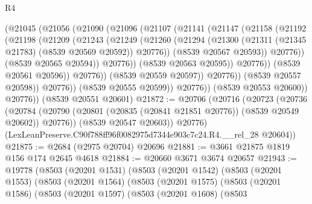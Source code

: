 \begin{lexlean}{R4}
\begin{coremodule}
                        (@21045
                          (@21056
                            (@21090
                              (@21096
                                (@21107
                                  (@21141
                                    (@21147
                                      (@21158
                                        (@21192
                                          (@21198
                                            (@21209
                                              (@21243
                                                (@21249
                                                  (@21260
                                                    (@21294
                                                      (@21300
                                                        (@21311
                                                          (@21345 @21783)
                                                          (@8539 @20569 @20592))
                                                        @20776))
                                                    (@8539 @20567 @20593))
                                                  @20776))
                                              (@8539 @20565 @20594))
                                            @20776))
                                        (@8539 @20563 @20595))
                                      @20776))
                                  (@8539 @20561 @20596))
                                @20776))
                            (@8539 @20559 @20597))
                          @20776))
                      (@8539 @20557 @20598))
                    @20776))
                (@8539 @20555 @20599))
              @20776))
          (@8539 @20553 @20600))
        @20776))
    (@8539 @20551 @20601)
@21872 := @20706
    (@20716
      (@20723
        (@20736
          (@20784 (@20790 (@20801 (@20835 (@20841 @21851 @20776)) (@8539 @20549 @20602)) @20776))
          (@8539 @20547 @20603))
        @20776)
      (LexLeanPreserve.C90f788ff96f0082975d7344e903c7c24.R4.__rel_28 @20604))
@21875 := @2684 (@2975 @20704) @20696
@21881 := @3661 @21875 @1819 @156 @174 @2645 @4618
@21884 := @20660 @3671 @3674 @20657
@21943 := @19778
    (@8503
      (@20201 @1531)
      (@8503
        (@20201 @1542)
        (@8503
          (@20201 @1553)
          (@8503
            (@20201 @1564)
            (@8503
              (@20201 @1575)
              (@8503
                (@20201 @1586)
                (@8503
                  (@20201 @1597)
                  (@8503
                    (@20201 @1608)
                    (@8503

\end{coremodule}
\end{lexlean}
